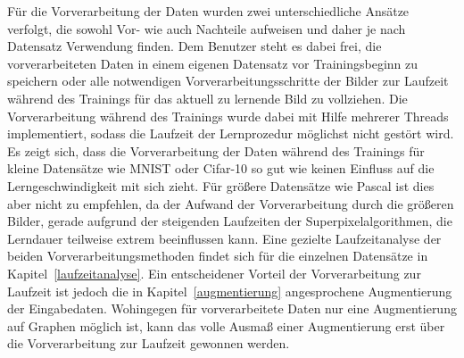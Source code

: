 Für die Vorverarbeitung der Daten wurden zwei unterschiedliche Ansätze verfolgt, die sowohl Vor- wie auch Nachteile aufweisen und daher je nach Datensatz Verwendung finden.
Dem Benutzer steht es dabei frei, die vorverarbeiteten Daten in einem eigenen Datensatz vor Trainingsbeginn zu speichern oder alle notwendigen Vorverarbeitungsschritte der Bilder zur Laufzeit während des Trainings für das aktuell zu lernende Bild zu vollziehen.
Die Vorverarbeitung während des Trainings wurde dabei mit Hilfe mehrerer Threads implementiert, sodass die Laufzeit der Lernprozedur möglichst nicht gestört wird.
Es zeigt sich, dass die Vorverarbeitung der Daten während des Trainings für kleine Datensätze wie \gls{MNIST} oder \gls{Cifar}-10 so gut wie keinen Einfluss auf die Lerngeschwindigkeit mit sich zieht.
Für größere Datensätze wie \gls{Pascal} ist dies aber nicht zu empfehlen, da der Aufwand der Vorverarbeitung durch die größeren Bilder, gerade aufgrund der steigenden Laufzeiten der Superpixelalgorithmen, die Lerndauer teilweise extrem beeinflussen kann.
Eine gezielte Laufzeitanalyse der beiden Vorverarbeitungsmethoden findet sich für die einzelnen Datensätze in Kapitel~\ref{laufzeitanalyse}.
Ein entscheidener Vorteil der Vorverarbeitung zur Laufzeit ist jedoch die in Kapitel~\ref{augmentierung} angesprochene Augmentierung der Eingabedaten.
Wohingegen für vorverarbeitete Daten nur eine Augmentierung auf Graphen möglich ist, kann das volle Ausmaß einer Augmentierung erst über die Vorverarbeitung zur Laufzeit gewonnen werden.
